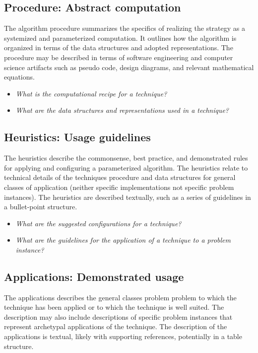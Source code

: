 \documentclass[a4paper, 11pt]{article}
\begin{document}
\subsection{Procedure: Abstract computation}
The algorithm procedure summarizes the specifics of realizing the strategy as a systemized and parameterized computation. It outlines how the algorithm is organized in terms of the data structures and adopted representations. The procedure may be described in terms of software engineering and computer science artifacts such as pseudo code, design diagrams, and relevant mathematical equations.

\begin{itemize}
	\item \emph{What is the computational recipe for a technique?}
	\item \emph{What are the data structures and representations used in a technique?}
\end{itemize}

\subsection{Heuristics: Usage guidelines}
The heuristics describe the commonsense, best practice, and demonstrated rules for applying and configuring a parameterized algorithm. The heuristics relate to technical details of the techniques procedure and data structures for general classes of application (neither specific implementations not specific problem instances). The heuristics are described textually, such as a series of guidelines in a bullet-point structure.

\begin{itemize}
	\item \emph{What are the suggested configurations for a technique?}
	\item \emph{What are the guidelines for the application of a technique to a problem instance?}
\end{itemize}

\subsection{Applications: Demonstrated usage}
The applications describes the general classes problem problem to which the technique has been applied or to which the technique is well suited. The description may also include descriptions of specific problem instances that represent archetypal applications of the technique. The description of the applications is textual, likely with supporting references, potentially in a table structure. 
\end{document}
